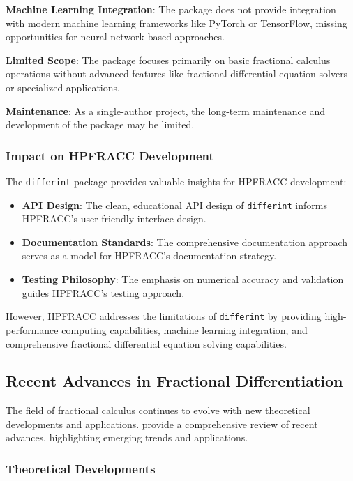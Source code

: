 \textbf{Machine Learning Integration}: The package does not provide integration with modern machine learning frameworks like PyTorch or TensorFlow, missing opportunities for neural network-based approaches.

\textbf{Limited Scope}: The package focuses primarily on basic fractional calculus operations without advanced features like fractional differential equation solvers or specialized applications.

\textbf{Maintenance}: As a single-author project, the long-term maintenance and development of the package may be limited.

\subsubsection{Impact on HPFRACC Development}

The \texttt{differint} package provides valuable insights for HPFRACC development:

\begin{itemize}
    \item \textbf{API Design}: The clean, educational API design of \texttt{differint} informs HPFRACC's user-friendly interface design.
    \item \textbf{Documentation Standards}: The comprehensive documentation approach serves as a model for HPFRACC's documentation strategy.
    \item \textbf{Testing Philosophy}: The emphasis on numerical accuracy and validation guides HPFRACC's testing approach.
\end{itemize}

However, HPFRACC addresses the limitations of \texttt{differint} by providing high-performance computing capabilities, machine learning integration, and comprehensive fractional differential equation solving capabilities.

\subsection{Recent Advances in Fractional Differentiation}

The field of fractional calculus continues to evolve with new theoretical developments and applications. \citet{Hafez2025ReviewFractionalDifferentiation} provide a comprehensive review of recent advances, highlighting emerging trends and applications.

\subsubsection{Theoretical Developments}

